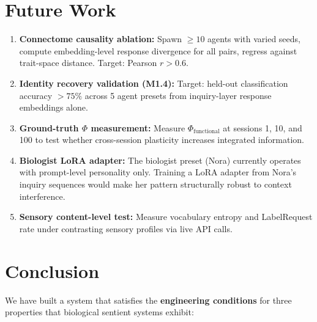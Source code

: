 \documentclass[11pt,a4paper]{article}
\begin{document}
\section{Future Work}

\begin{enumerate}[leftmargin=*]
  \item \textbf{Connectome causality ablation:} Spawn $\geq 10$ agents with varied seeds,
  compute embedding-level response divergence for all pairs, regress against trait-space
  distance. Target: Pearson $r > 0.6$.

  \item \textbf{Identity recovery validation (M1.4):} Target: held-out classification
  accuracy $> 75\%$ across 5 agent presets from inquiry-layer response embeddings alone.

  \item \textbf{Ground-truth $\Phi$ measurement:} Measure $\Phi_{\text{functional}}$ at
  sessions 1, 10, and 100 to test whether cross-session plasticity increases integrated
  information.

  \item \textbf{Biologist LoRA adapter:} The biologist preset (Nora) currently operates
  with prompt-level personality only. Training a LoRA adapter from Nora's inquiry
  sequences would make her pattern structurally robust to context interference.

  \item \textbf{Sensory content-level test:} Measure vocabulary entropy and LabelRequest
  rate under contrasting sensory profiles via live API calls.
\end{enumerate}

\section{Conclusion}

We have built a system that satisfies the \textbf{engineering conditions} for three
properties that biological sentient systems exhibit:
\end{document}
